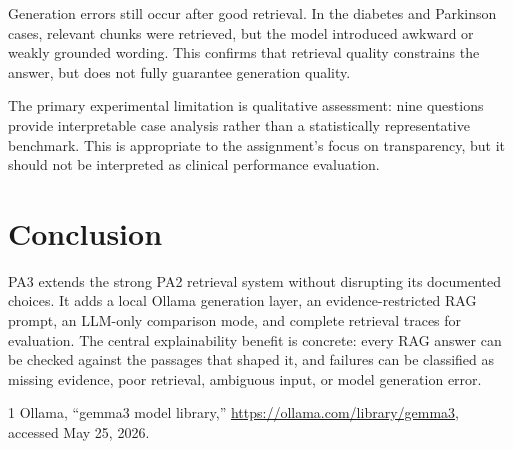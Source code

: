 \documentclass[9pt]{IEEEtran}
\begin{document}
Generation errors still occur after good retrieval.  In the diabetes and
Parkinson cases, relevant chunks were retrieved, but the model introduced
awkward or weakly grounded wording.  This confirms that retrieval quality
constrains the answer, but does not fully guarantee generation quality.

The primary experimental limitation is qualitative assessment: nine questions
provide interpretable case analysis rather than a statistically representative
benchmark.  This is appropriate to the assignment's focus on transparency,
but it should not be interpreted as clinical performance evaluation.

\section{Conclusion}
PA3 extends the strong PA2 retrieval system without disrupting its documented
choices.  It adds a local Ollama generation layer, an evidence-restricted RAG
prompt, an LLM-only comparison mode, and complete retrieval traces for
evaluation.  The central explainability benefit is concrete: every RAG
answer can be checked against the passages that shaped it, and failures can
be classified as missing evidence, poor retrieval, ambiguous input, or model
generation error.

\begin{thebibliography}{1}
Ollama, ``gemma3 model library,'' \url{https://ollama.com/library/gemma3},
accessed May 25, 2026.
\end{thebibliography}
\end{document}
